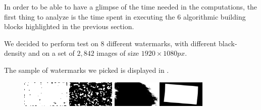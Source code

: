\documentclass[12pt,a4paper,english]{article}
\begin{document}
In order to be able to have a glimpse of the time needed in the computations, the first thing to analyze is the time spent in executing the $6$ algorithmic building blocks highlighted in the previous section.

We decided to perform test on $8$ different watermarks, with different black-density and on a set of $2,842$ images of size $1920 \times 1080 px$.

The sample of watermarks we picked is displayed in .

\begin{figure}[h]
  \centering
  \includegraphics[width=0.2\textwidth]{../Images/wm/blotches-01.png}\hspace{0.38cm}
  \includegraphics[width=0.2\textwidth]{../Images/wm/blotches-15.png}\hspace{0.38cm}
  \includegraphics[width=0.2\textwidth]{../Images/wm/plasma-11.png}\hspace{0.38cm}
  \includegraphics[width=0.2\textwidth]{../Images/wm/polaroid-02.png}

  \vspace{0.5cm}


\end{figure}
\end{document}
